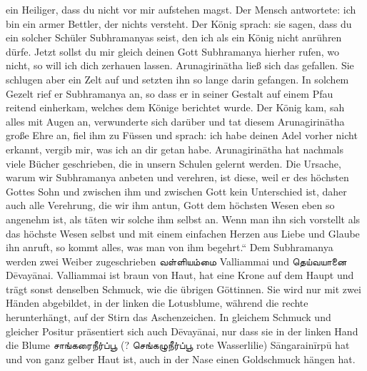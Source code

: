 \documentclass{article}
\newcommand{\TamilText}[1]{\texttamil{#1}}
\newcommand{\tam}[1]{\TamilText{#1}}
\begin{document}
ein Heiliger, dass du nicht vor mir aufstehen magst. Der Mensch antwortete: ich bin ein armer Bettler, der nichts versteht. Der König sprach: sie sagen, dass du ein solcher Schüler Subhramanyas seist, den ich als ein König nicht anrühren dürfe. Jetzt sollst du mir gleich deinen Gott Subhramanya hierher rufen, wo nicht, so will ich dich zerhauen lassen. Arunagirin\={a}tha ließ sich das gefallen. Sie schlugen aber ein Zelt auf und setzten ihn so lange darin gefangen. In solchem Gezelt rief er Subhramanya an, so dass er in seiner Gestalt auf einem Pfau reitend einherkam, welches dem Könige berichtet wurde. Der König kam, sah alles mit Augen an, verwunderte sich darüber und tat diesem Arunagirin\={a}tha große Ehre an, fiel ihm zu Füssen und sprach: ich habe deinen Adel vorher nicht erkannt, vergib mir, was ich an dir getan habe. Arunagirin\={a}tha hat nachmals viele Bücher geschrieben, die in unsern Schulen gelernt werden. Die Ursache, warum wir Subhramanya anbeten und verehren, ist diese, weil er des höchsten Gottes Sohn und zwischen ihm und zwischen Gott kein Unterschied ist, daher auch alle Verehrung, die wir ihm antun, Gott dem höchsten Wesen eben so angenehm ist, als täten wir solche ihm selbst an. Wenn man ihn sich vorstellt als das höchste Wesen selbst und mit einem einfachen Herzen aus Liebe und Glaube ihn anruft, so kommt alles, was man von ihm begehrt.“ Dem Subhramanya werden zwei Weiber zugeschrieben \tam{வள்ளியம்மை} Valliammai und \tam{தெய்வயானை} D\={e}vay\={a}nai. Valliammai ist braun von Haut, hat eine Krone auf dem Haupt und trägt sonst denselben Schmuck, wie die übrigen Göttinnen. Sie wird nur mit zwei Händen abgebildet, in der linken die Lotusblume, während die rechte herunterhängt, auf der Stirn das Aschenzeichen. In gleichem Schmuck und gleicher Positur präsentiert sich auch D\={e}vay\={a}nai, nur dass sie in der linken Hand die Blume \tam{சாங்கரைநீர்ப்பூ} (? \tam{செங்கழுநீர்ப்பூ} rote Wasserlilie) S\={a}ngarain\={i}rp\={u} hat und von ganz gelber Haut ist, auch in der Nase einen Goldschmuck hängen hat.
\end{document}
